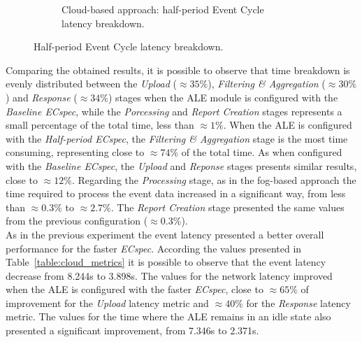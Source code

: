 \begin{figure}[ht!]
\begin{subfigure}{.5\textwidth}
    \caption{Cloud-based approach: half-period Event Cycle\\ latency breakdown.}
    \label{fig:ecspecf_effective_half}
  \end{subfigure}
  \caption{Half-period Event Cycle latency breakdown.}
  \label{fig:ecspecf_effective_breakdown}
\end{figure}

Comparing the obtained results, it is possible to observe that time breakdown is evenly distributed
between the \textit{Upload} ($\approx35\%$), \textit{Filtering \& Aggregation} ($\approx30\%$) and
\textit{Response} ($\approx34\%$) stages when the \gls{ALE} module is configured with the \textit{Baseline ECspec},
while the \textit{Porcessing} and \textit{Report Creation} stages represents a small percentage of the
total time, less than $\approx1\%$. When the \gls{ALE} is configured with the \textit{Half-period ECspec},
the \textit{Filtering \& Aggregation} stage is the most time consuming, representing close to $\approx 74\%$
of the total time. As when configured with the \textit{Baseline ECspec}, the \textit{Upload} and
\textit{Reponse} stages presents similar results, close to $\approx12\%$. Regarding the \textit{Processing}
stage, as in the fog-based approach the time required to process the event data increased in a significant
way, from less than $\approx0.3\%$ to $\approx2.7\%$. The \textit{Report Creation} stage presented the
same values from the previous configuration ($\approx0.3\%$).\\

As in the previous experiment the event latency presented a better overall performance for the faster \textit{ECspec}.
According the values presented in Table~\ref{table:cloud_metrics} it is possible to observe that the event
latency decrease from 8.244s to 3.898s. The values for the network latency improved when the \gls{ALE} is
configured with the faster \textit{ECspec}, close to $\approx65\%$ of improvement for the \textit{Upload}
latency metric and $\approx40\%$ for the \textit{Response} latency metric. The values for the time where
the \gls{ALE} remains in an idle state also presented a significant improvement, from 7.346s to 2.371s.\\

